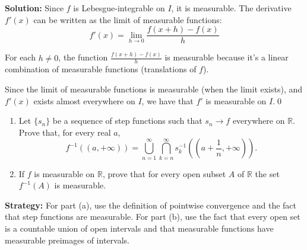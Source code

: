 \bigskip\noindent\textbf{Solution:}
Since $f$ is Lebesgue-integrable on $I$, it is measurable. The derivative $f'(x)$ can be written as the limit of measurable functions:
\[f'(x) = \lim_{h \to 0} \frac{f(x + h) - f(x)}{h}\]

For each $h \neq 0$, the function $\frac{f(x + h) - f(x)}{h}$ is measurable because it's a linear combination of measurable functions (translations of $f$).

Since the limit of measurable functions is measurable (when the limit exists), and $f'(x)$ exists almost everywhere on $I$, we have that $f'$ is measurable on $I$.\qed


\begin{problembox}
\begin{problemstatement}
\begin{enumerate}[label=(\alph*)]
\item Let $\{s_n\}$ be a sequence of step functions such that $s_n \to f$ everywhere on $\mathbb{R}$. Prove that, for every real $a$,
\[f^{-1}((a, +\infty)) = \bigcup_{n=1}^\infty \bigcap_{k=n}^\infty s_k^{-1} \left( \left( a + \frac{1}{n}, +\infty \right) \right).\]
\item If $f$ is measurable on $\mathbb{R}$, prove that for every open subset $A$ of $\mathbb{R}$ the set $f^{-1}(A)$ is measurable.
\end{enumerate}
\end{problemstatement}
\end{problembox}

\noindent\textbf{Strategy:} For part (a), use the definition of pointwise convergence and the fact that step functions are measurable. For part (b), use the fact that every open set is a countable union of open intervals and that measurable functions have measurable preimages of intervals.

